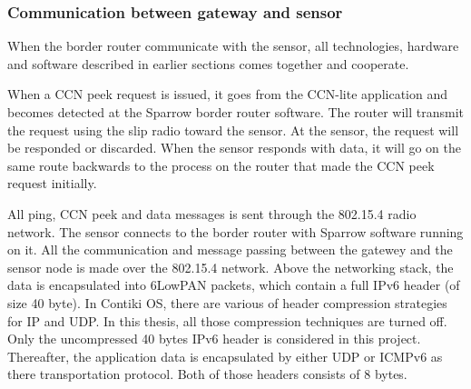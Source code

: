 \subsubsection{Communication between gateway and sensor}

When the border router communicate with the sensor, all technologies, hardware and software described in earlier sections comes together and cooperate.

When a CCN peek request is issued, it goes from the CCN-lite application and becomes detected at the Sparrow border router software. The router will transmit the request using the slip radio toward the sensor. At the sensor, the request will be responded or discarded. When the sensor responds with data, it will go on the same route backwards to the process on the router that made the CCN peek request initially.

All ping, CCN peek and data messages is sent through the 802.15.4 radio network. The sensor connects to the border router with Sparrow software running on it. All the communication and message passing between the gatewey and the sensor node is made over the 802.15.4 network. Above the networking stack, the data is encapsulated into 6LowPAN packets, which contain a full IPv6 header (of size 40 byte). In Contiki OS, there are various of header compression strategies for IP and UDP. In this thesis, all those compression techniques are turned off. Only the uncompressed 40 bytes IPv6 header is considered in this project. Thereafter, the application data is encapsulated by either UDP or ICMPv6 as there transportation protocol. Both of those headers consists of 8 bytes. 


 



